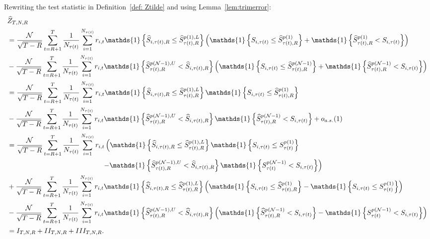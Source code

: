 Rewriting the test statistic in Definition~\ref{def: Ztilde} and using Lemma~\ref{lem:trimerror}:
\begin{align*}
    &\widehat{Z}_{T,N,R} \\
    &=\frac{\mathcal{N}}{\sqrt{T-R}}\sum_{t=R+1}^{T}\frac{1}{N_{\tau(t)}}\sum_{i=1}^{N_{\tau(t)}} r_{i,t} \mathds{1} \left\{ \widehat{S}_{i,\tau(t),R}\leq \widehat{S}_{\tau(t),R}^{p(1),L} \right\} \left( \mathds{1} \left\{ S_{i,\tau(t)} \leq \widehat{S}_{\tau(t),R}^{p(1)} \right\} + \mathds{1} \left\{ \widehat{S}_{\tau(t),R}^{p(1)} < S_{i,\tau(t)} \right\} \right) \\
    &- \frac{\mathcal{N}}{\sqrt{T-R}}\sum_{t=R+1}^{T}\frac{1}{N_{\tau(t)}}\sum_{i=1}^{N_{\tau(t)}} r_{i,t} \mathds{1}\left\{  \widehat{S}_{\tau(t),R}^{p(\mathcal{N}-1),U} < \widehat{S}_{i,\tau(t),R}\right\} \left( \mathds{1} \left\{ S_{i,\tau(t)} \leq  \widehat{S}_{\tau(t),R}^{p(\mathcal{N}-1)} \right\} + \mathds{1} \left\{ \widehat{S}_{\tau(t),R}^{p(\mathcal{N}-1)} < S_{i,\tau(t)} \right\} \right) \\
    &=\frac{\mathcal{N}}{\sqrt{T-R}}\sum_{t=R+1}^{T}\frac{1}{N_{\tau(t)}}\sum_{i=1}^{N_{\tau(t)}} r_{i,t} \mathds{1} \left\{ \widehat{S}_{i,\tau(t),R}\leq \widehat{S}_{\tau(t),R}^{p(1),L} \right\} \mathds{1} \left\{ S_{i,\tau(t)} \leq \widehat{S}_{\tau(t),R}^{p(1)} \right\} \\
    &- \frac{\mathcal{N}}{\sqrt{T-R}}\sum_{t=R+1}^{T}\frac{1}{N_{\tau(t)}}\sum_{i=1}^{N_{\tau(t)}} r_{i,t} \mathds{1}\left\{ \widehat{S}_{\tau(t),R}^{p(\mathcal{N}-1),U} < \widehat{S}_{i,\tau(t),R}\right\} \mathds{1} \left\{ \widehat{S}_{\tau(t),R}^{p(\mathcal{N}-1)} < S_{i,\tau(t)} \right\} + o_{a.s.}(1) \\
    &=\frac{\mathcal{N}}{\sqrt{T-R}}\sum_{t=R+1}^{T}\frac{1}{N_{\tau(t)}}\sum_{i=1}^{N_{\tau(t)}}r_{i,t}\left( \mathds{1} \left\{ \widehat{S}_{i,\tau(t),R}\leq \widehat{S}_{\tau(t),R}^{p(1),L}\right\} \mathds{1} \left\{ S_{i,\tau(t)}\leq S_{\tau(t)}^{p(1)}\right\} \right. \\
    & \hspace{4.8cm} \left. -\mathds{1} \left\{ \widehat{S}_{\tau(t),R}^{p(\mathcal{N}-1),U} < \widehat{S}_{i,\tau(t),R}\right\} \mathds{1} \left\{ S_{\tau(t)}^{p(\mathcal{N}-1)} < S_{i,\tau(t)}\right\} \right) \\
    &+\frac{\mathcal{N}}{\sqrt{T-R}}\sum_{t=R+1}^{T}\frac{1}{N_{\tau(t)}}\sum_{i=1}^{N_{\tau(t)}}r_{i,t} \mathds{1} \left\{ \widehat{S}_{i,\tau(t),R}\leq \widehat{S}_{\tau(t),R}^{p(1),L}\right\} \left( \mathds{1} \left\{ S_{i,\tau(t)}\leq \widehat{S}_{\tau(t),R}^{p(1)}\right\} -\mathds{1} \left\{ S_{i,\tau(t)}\leq S_{\tau(t)}^{p(1)}\right\} \right) \\
    &-\frac{\mathcal{N}}{\sqrt{T-R}}\sum_{t=R+1}^{T}\frac{1}{N_{\tau(t)}}\sum_{i=1}^{N_{\tau(t)}}r_{i,t} \mathds{1} \left\{\widehat{S}_{\tau(t),R}^{p(\mathcal{N}-1),U} < \widehat{S}_{i,\tau(t),R}\right\} \left( \mathds{1} \left\{ \widehat{S}_{\tau(t),R}^{p(\mathcal{N}-1)} < S_{i,\tau(t)} \right\} -\mathds{1} \left\{ S_{\tau(t)}^{p(\mathcal{N}-1)} < S_{i,\tau(t)}\right\} \right) \\
    &=I_{T,N,R}+II_{T,N,R}+III_{T,N,R}.
\end{align*}
